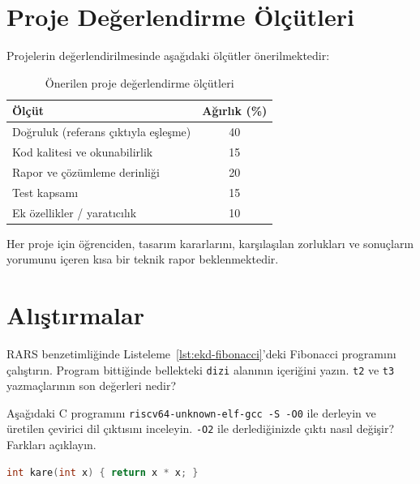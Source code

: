 \section{Proje Değerlendirme Ölçütleri}
\label{sec:ekd-degerlendirme}

Projelerin değerlendirilmesinde aşağıdaki ölçütler önerilmektedir:

\begin{table}[H]
\centering
\caption[Proje değerlendirme ölçütleri]{Önerilen proje değerlendirme ölçütleri}
\label{tab:ekd-degerlendirme}
\begin{tabular}{@{}lc@{}}
\toprule
\textbf{Ölçüt} & \textbf{Ağırlık (\%)} \\
\midrule
Doğruluk (referans çıktıyla eşleşme)   & 40 \\
Kod kalitesi ve okunabilirlik            & 15 \\
Rapor ve çözümleme derinliği                & 20 \\
Test kapsamı                             & 15 \\
Ek özellikler / yaratıcılık             & 10 \\
\bottomrule
\end{tabular}
\end{table}

Her proje için öğrenciden, tasarım kararlarını, karşılaşılan zorlukları ve sonuçların yorumunu içeren kısa bir teknik rapor beklenmektedir.


\section*{Alıştırmalar}

\begin{alistirma}[\kolay]
RARS benzetimliğinde Listeleme~\ref{lst:ekd-fibonacci}'deki Fibonacci programını çalıştırın. Program bittiğinde bellekteki \texttt{dizi} alanının içeriğini yazın. \texttt{t2} ve \texttt{t3} yazmaçlarının son değerleri nedir?
\end{alistirma}

\begin{alistirma}[\kolay]
Aşağıdaki C programını \texttt{riscv64-unknown-elf-gcc -S -O0} ile derleyin ve üretilen çevirici dil çıktısını inceleyin. \texttt{-O2} ile derlediğinizde çıktı nasıl değişir? Farkları açıklayın.
\begin{lstlisting}[language=C, style=alistirma-kod]
int kare(int x) { return x * x; }
\end{lstlisting}
\end{alistirma}


